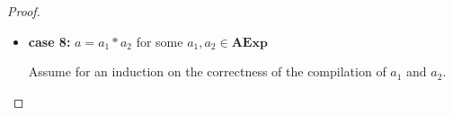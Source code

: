 \documentclass{article}
\begin{document}
\begin{proof}
\begin{itemize}
    Assume for an induction on the correctness of the compilation of $a_1$ and $a_2$.

    \[
      \begin{aligned}
        \langle  \mathcal{CA}(a) : c,\, e,\, \sigma,\, s,\, pc \rangle 
        &= \langle \mathcal{CA}(a_1 + a_2) : c,\, e,\, \sigma,\, s,\, pc \rangle \\
        &= \langle \mathcal{CA}(a_2) : \mathcal{CA}(a_1) : \texttt{ADD} :  c,\, e,\, \sigma,\, s,\, pc \rangle 
        && \text{(definition of $\mathcal{CA}$)} \\
        &\triangleright^{\ast} \langle \mathcal{CA}(a_1) : \texttt{ADD} :  c,\, \mathcal{A}(a_2, \sigma, s) : e,\, \sigma,\, s,\, pc + l_2 \rangle 
        && \text{(induction hypothesis 2)} \\
        &\triangleright^{\ast} \langle \texttt{ADD} :  c,\, \mathcal{A}(a_1, \sigma, s) : \mathcal{A}(a_2, \sigma, s) : e,\, \sigma,\, s,\, pc + l_2 + l_1 \rangle 
        && \text{(induction hypothesis 1)} \\
        &\triangleright \langle c,\, (\mathcal{A}(a_1, \sigma, s) + \mathcal{A}(a_2, \sigma, s)) : e,\, \sigma,\, s,\, pc + l_2 + l_1 + 1 \rangle 
        && \text{(operational semantics)} \\
        &= \langle c,\, \mathcal{A}(a_1 + a_2, \sigma, s) : e,\, \sigma,\, s,\, pc + l_2 + l_1 + 1 \rangle
        && \text{(definition of $\mathcal{A}$)} \\
        &= \langle c,\, \mathcal{A}(a, \sigma, s) : e,\, \sigma,\, s,\, pc + l_2 + l_1 + 1 \rangle \\
      \end{aligned}
  \]

    \item \textbf{case 8: } $a = a_1 \ast a_2$ for some $a_1, a_2 \in \textbf{AExp}$

    Assume for an induction on the correctness of the compilation of $a_1$ and $a_2$.


\end{itemize}
\end{proof}
\end{document}
